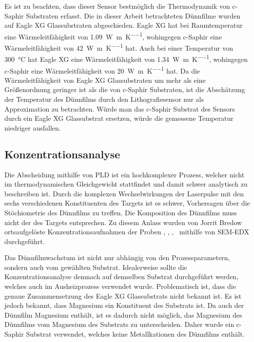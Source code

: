 Es ist zu beachten, dass dieser Sensor bestmöglich die Thermodynamik von c-Saphir Substraten erfasst.
Die in dieser Arbeit betrachteten Dünnfilme wurden auf Eagle XG Glassubstraten abgeschieden.
Eagle XG hat bei Raumtemperatur eine Wärmeleitfähigkeit von \qty{1.09}{\watt\per\meter\per\kelvin}, wohingegen
c-Saphir eine Wärmeleitfähigkeit von \qty{42}{\watt\per\meter\per\kelvin} hat.
Auch bei einer Temperatur von \qty{300}{\degreeCelsius} hat Eagle XG eine Wärmeleitfähigkeit von
\qty{1.34}{\watt\per\meter\per\kelvin}, wohingegen c-Saphir eine Wärmeleitfähigkeit von
\qty{20}{\watt\per\meter\per\kelvin} hat.
Da die Wärmeleitfähigkeit von Eagle XG Glassubstraten um mehr als eine Größenordnung geringer ist als die von
c-Saphir Substraten, ist die Abschätzung der Temperatur des Dünnfilms durch den Lithografiesensor nur als
Approximation zu betrachten.
Würde man das c-Saphir Substrat des Sensors durch ein Eagle XG Glassubstrat ersetzen, würde die gemessene Temperatur
niedriger ausfallen.

\subsection{Konzentrationsanalyse}\label{subsec:edx-analyse}
Die Abscheidung mithilfe von PLD ist ein hochkomplexer Prozess, welcher nicht im thermodynamischen Gleichgewicht
stattfindet und damit schwer analytisch zu beschreiben ist.
Durch die komplexen Wechselwirkungen der Laserpulse mit den sechs verschiedenen Konstituenten des Targets
ist es schwer, Vorhersagen über die Stöchiometrie des Dünnfilms zu treffen.
Die Komposition des Dünnfilms muss nicht der des Targets entsprechen.
Zu diesem Anlass wurden von Jorrit Bredow ortsaufgelöste Konzentrationsaufnahmen der Proben \csamplethree, \csampleone,
\csampletwo, \csamplefour\ mithilfe von SEM-EDX durchgeführt.

Das Dünnfilmwachstum ist nicht nur abhängig von den Prozessparametern, sondern auch vom gewählten Substrat.
Idealerweise sollte die Konzentrationsanalyse demnach auf demselben Substrat durchgeführt werden, welches auch im
Ausheizprozess verwendet wurde.
Problematisch ist, dass die genaue Zusammensetzung des Eagle XG Glassubstrats nicht bekannt ist.
Es ist jedoch bekannt, dass Magnesium ein Konstituent des Substrats ist.
Da auch der Dünnfilm Magnesium enthält, ist es dadurch nicht möglich, das Magnesium des Dünnfilms vom Magnesium des
Substrats zu unterscheiden.
Daher wurde ein c-Saphir Substrat verwendet, welches keine Metallkationen des Dünnfilms enthält.

